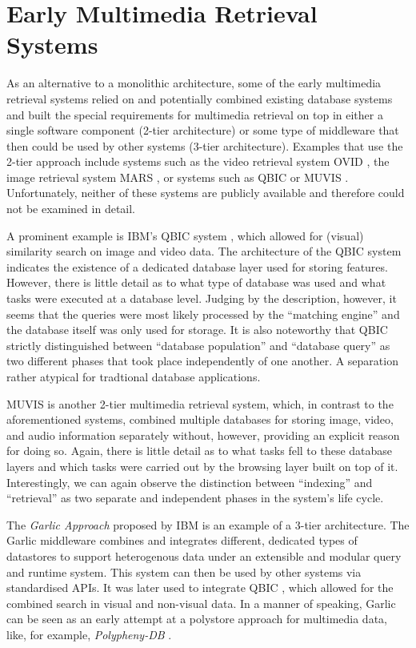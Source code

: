 \section{Early Multimedia Retrieval Systems}

As an alternative to a monolithic architecture, some of the early multimedia retrieval systems relied on and potentially combined existing database systems and built the special requirements for multimedia retrieval on top in either a single software component (2-tier architecture) or some type of middleware that then could be used by other systems (3-tier architecture). Examples that use the 2-tier approach include systems such as the video retrieval system OVID \cite{Oomoto:1993OVID}, the image retrieval system MARS \cite{Rui:1997Content}, or systems such as QBIC \cite{Flickner:1995Query} or MUVIS \cite{Kiranyaz:2003Muvis}. Unfortunately, neither of these systems are publicly available and therefore could not be examined in detail.

A prominent example is IBM's QBIC system \cite{Flickner:1995Query}, which allowed for (visual) similarity search on image and video data. The architecture of the QBIC system indicates the existence of a dedicated database layer used for storing features. However, there is little detail as to what type of database was used and what tasks were executed at a database level. Judging by the description, however, it seems that the queries were most likely processed by the ``matching engine'' and the database itself was only used for storage. It is also noteworthy that QBIC strictly distinguished between ``database population'' and ``database query'' as two different phases that took place independently of one another. A separation rather atypical for tradtional database applications.

MUVIS \cite{Kiranyaz:2003Muvis} is another 2-tier multimedia retrieval system, which, in contrast to the aforementioned systems, combined multiple databases for storing image, video, and audio information separately without, however, providing an explicit reason for doing so. Again, there is little detail as to what tasks fell to these database layers and which tasks were carried out by the browsing layer built on top of it. Interestingly, we can again observe the distinction between ``indexing'' and ``retrieval'' as two separate and independent phases in the system's life cycle.

The \emph{Garlic Approach} \cite{Carey:1995Towards} proposed by IBM is an example of a 3-tier architecture. The Garlic middleware combines and integrates different, dedicated types of datastores to support heterogenous data under an extensible and modular query and runtime system. This system can then be used by other systems via standardised APIs. It was later used to integrate QBIC \cite{Cody:1995Querying}, which allowed for the combined search in visual and non-visual data. In a manner of speaking, Garlic can be seen as an early attempt at a polystore approach for multimedia data, like, for example, \emph{Polypheny-DB} \cite{Vogt:2018Polypheny}. 

